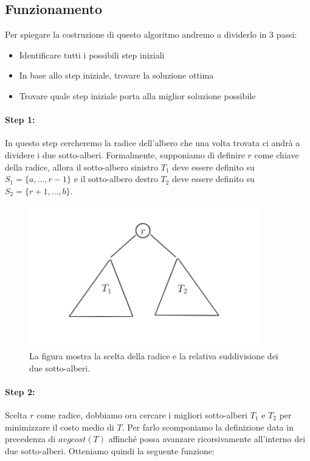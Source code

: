 \subsection{Funzionamento}

Per spiegare la costruzione di questo algoritmo andremo a dividerlo in 3 passi:

\begin{itemize}
    \item Identificare tutti i possibili step iniziali
    \item In base allo step iniziale, trovare la soluzione ottima
    \item Trovare quale step iniziale porta alla miglior soluzione possibile
\end{itemize}

\paragraph{Step 1:}
In questo step cercheremo la radice dell'albero che una volta trovata ci andrà a
dividere i due sotto-alberi. Formalmente, supponiamo di definire $r$ come chiave
della radice, allora il sotto-albero sinistro $T_1$ deve essere definito su $S_1
    = \{a, \ldots, r -1\}$ e il sotto-albero destro $T_2$ deve essere definito su
$S_2 = \{r + 1, \ldots, b\}$.

\begin{figure}[H]
    \centering
    \includegraphics[width=10cm, keepaspectratio]{capitoli/dynamic_programming/imgs/binser_subtree.png}
    \caption{La figura mostra la scelta della radice e la relativa suddivisione dei due sotto-alberi.}
\end{figure}

\paragraph{Step 2:}
Scelta $r$ come radice, dobbiamo ora cercare i migliori sotto-alberi $T_1$ e
$T_2$ per minimizzare il costo medio di $T$. Per farlo scomponiamo la definizione
data in precedenza di $avgcost(T)$ affinché possa avanzare ricorsivamente
all'interno dei due sotto-alberi. Otteniamo quindi la seguente funzione:

